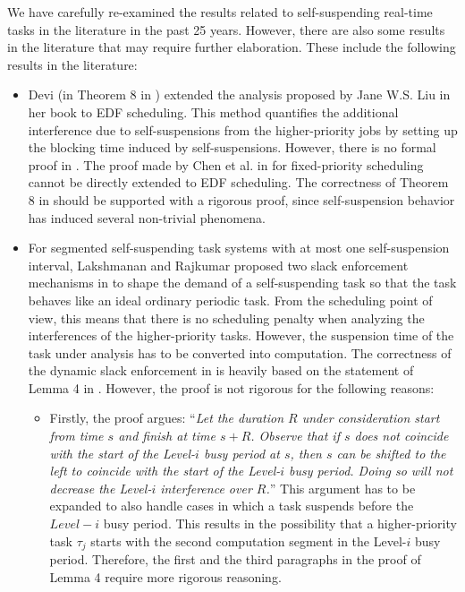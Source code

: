 \label{sec:open-issues-existing}  
We have carefully re-examined the results related to self-suspending
real-time tasks in the literature in the past 25 years. However, there
are also some results in the literature that may require further
elaboration. These include the following results in the literature:
\begin{itemize}
\item Devi (in Theorem 8 in \cite[Section
  4.5]{DBLP:conf/ecrts/Devi03}) extended the analysis proposed by Jane
  W.S. Liu in her book \cite[Page 164-165]{Liu:2000:RS:518501} to
  EDF scheduling. This method quantifies the additional interference
  due to self-suspensions from the higher-priority jobs by setting up
  the blocking time induced by self-suspensions. However, there
  is no formal proof in \cite{DBLP:conf/ecrts/Devi03}. The proof made
  by Chen et al. in \cite{ChenHuangNelissen,ChenECRTS2016-suspension} for fixed-priority
  scheduling cannot be directly extended to EDF scheduling. The
  correctness of Theorem 8 in \cite[Section
  4.5]{DBLP:conf/ecrts/Devi03} should be supported with a rigorous
  proof, since self-suspension behavior has induced several
  non-trivial phenomena.

\item For segmented self-suspending task systems with at most one
  self-suspension interval, Lakshmanan and Rajkumar proposed two slack
  enforcement mechanisms in \cite{LR:rtas10} to shape the demand of a
  self-suspending task so that the task behaves like an ideal ordinary
  periodic
  task.  From the scheduling point of view, this means that there is
  no scheduling penalty when analyzing the interferences of the
  higher-priority tasks. However, the suspension time of the task under
  analysis has to be converted into computation. The correctness of the dynamic slack
  enforcement in \cite{LR:rtas10} is heavily based on the statement of Lemma
  4 in \cite{LR:rtas10}. However, the proof is not rigorous for the
  following reasons:
  \begin{itemize}
  \item Firstly, the proof argues: ``\emph{Let the duration $R$ under
    consideration start from time $s$ and finish at time $s +
    R$. Observe that if $s$ does not coincide with the start of the
    Level-$i$ busy period at $s$, then $s$ can be shifted to the left
    to coincide with the start of the Level-$i$ busy period. Doing so
    will not decrease the Level-$i$ interference over $R$.}'' This
    argument has to be expanded to also handle cases in which a task
    suspends before the $Level-i$ busy period. This results in the
    possibility that a higher-priority task $\tau_j$ starts with the
    second computation segment in the Level-$i$ busy
    period. Therefore, the first and the third paragraphs in the proof
    of Lemma 4 \cite{LR:rtas10} require more rigorous reasoning.


\end{itemize}
\end{itemize}
